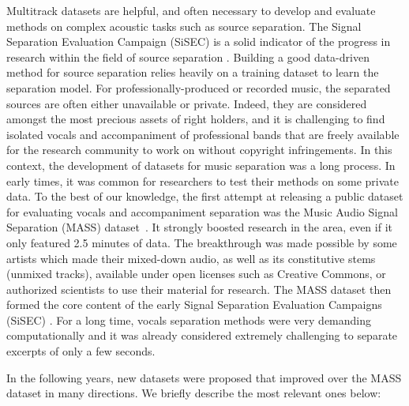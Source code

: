 Multitrack datasets are helpful, and often necessary to develop and evaluate methods on complex acoustic tasks such as source separation.
The Signal Separation Evaluation Campaign (SiSEC) is a solid indicator of the progress in research within the field of source separation \cite{sisec13, ono15, liutkus17, stoeter18sisec}.
Building a good data-driven method for source separation relies heavily on a training dataset to learn the separation model. 
For professionally-produced or recorded music, the separated sources are often either unavailable or private. 
Indeed, they are considered amongst the most precious assets of right holders, and it is challenging to find isolated vocals and accompaniment of professional bands that are freely available for the research community to work on without copyright infringements.
In this context, the development of datasets for music separation was a long process. 
In early times, it was common for researchers to test their methods on some private data. 
To the best of our knowledge, the first attempt at releasing a public dataset for evaluating vocals and accompaniment separation was the Music Audio Signal Separation (MASS) dataset~\cite{MTGMASSdb}.
It strongly boosted research in the area, even if it only featured 2.5 minutes of data. The breakthrough was made possible by some artists which made their mixed-down audio, as well as its constitutive stems (unmixed tracks), available under open licenses such as Creative Commons, or authorized scientists to use their material for research.
% 
The MASS dataset then formed the core content of the early Signal Separation Evaluation Campaigns (SiSEC) \cite{vincent09}. 
For a long time, vocals separation methods were very demanding computationally and it was already considered extremely challenging to separate excerpts of only a few seconds.

In the following years, new datasets were proposed that improved over the MASS dataset in many directions. 
We briefly describe the most relevant ones below:

